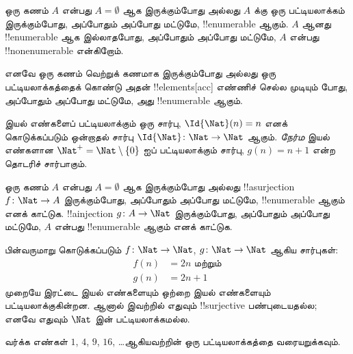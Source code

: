 \documentclass[../../../include/open-logic-section]{subfiles}
\begin{document}
\begin{defn}
  ஒரு கணம் $A$ என்பது $A = \emptyset$ ஆக இருக்கும்போது அல்லது
  $A$ க்கு ஒரு பட்டியலாக்கம் இருக்கும்போது, அப்போதும் அப்போது மட்டுமே,
  !!{enumerable} ஆகும்.
  $A$ ஆனது !!{enumerable} ஆக இல்லாதபோது, அப்போதும் அப்போது மட்டுமே,
  $A$ என்பது !!{nonenumerable} என்கிறோம்.
\end{defn}

\begin{explain}
எனவே ஒரு கணம் வெற்றுக் கணமாக இருக்கும்போது அல்லது
ஒரு பட்டியலாக்கத்தைக் கொண்டு அதன் !!{element}s[acc]
எண்ணிச் செல்ல முடியும் போது, அப்போதும் அப்போது மட்டுமே,
அது !!{enumerable} ஆகும்.
\end{explain}

\begin{ex}
இயல் எண்களைப் பட்டியலாக்கும் ஒரு சார்பு,
$\Id{\Nat}(n) = n$ எனக் கொடுக்கப்படும்
ஒன்றாதல் சார்பு $\Id{\Nat} \colon \Nat \to \Nat$ ஆகும்.
\emph{நேர்ம} இயல் எண்களான $\Nat^+ =
\Nat \setminus \{0\}$ ஐப் பட்டியலாக்கும் சார்பு,
$g(n) = n + 1$ என்ற தொடரிச் சார்பாகும்.
\end{ex}

\begin{prob}
ஒரு கணம் $A$ என்பது $A = \emptyset$ ஆக இருக்கும்போது அல்லது
!!a{surjection} $f\colon \Nat \to A$ இருக்கும்போது,
அப்போதும் அப்போது மட்டுமே, !!{enumerable} ஆகும் எனக் காட்டுக.
!!a{injection} $g\colon A \to \Nat$ இருக்கும்போது,
அப்போதும் அப்போது மட்டுமே, $A$ என்பது !!{enumerable} ஆகும் எனக் காட்டுக.
\end{prob}

\begin{ex}
பின்வருமாறு கொடுக்கப்படும்
$f\colon \Nat \to \Nat$, $g \colon \Nat \to \Nat$ ஆகிய சார்புகள்:
\begin{align*}
  f(n) & = 2n \text{ மற்றும்}\\
  g(n) & = 2n+1
\end{align*}
முறையே இரட்டை இயல் எண்களையும் ஒற்றை இயல் எண்களையும்
பட்டியலாக்குகின்றன.
ஆனால் இவற்றில் எதுவும் !!{surjective} பண்புடையதல்ல;
எனவே எதுவும் $\Nat$ இன் பட்டியலாக்கமல்ல.
\end{ex}

\begin{prob}
வர்க்க எண்கள் $1$, $4$, $9$, $16$, \dots ஆகியவற்றின்
ஒரு பட்டியலாக்கத்தை வரையறுக்கவும்.
\end{prob}
\end{document}
